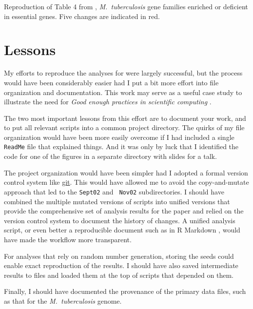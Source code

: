 \begin{table}
\caption{Reproduction of Table 4 from \citet{lamichhane2003},
\emph{M.\ tuberculosis\/} gene families enriched or deficient in
essential genes. Five changes are indicated in red.\label{tab:tab4}}

\centering
\small

\end{table}





\section{Lessons}


My efforts to reproduce the analyses for \citet{lamichhane2003} were
largely successful, but the process would have been considerably
easier had I put a bit more effort into file organization and
documentation. This work may serve as a useful case study to
illustrate the need for \emph{Good enough practices in scientific
computing} \citep{wilson2017}.

The two most important lessons from this effort are to document your
work, and to put all relevant scripts into a common project directory.
The quirks of my file organization would have been more easily
overcome if I had included a single {\tt ReadMe} file that explained
things. And it was only by luck that I identified the code for one of
the figures in a separate directory with slides for a talk.

The project organization would have been simpler had I
adopted a formal version control system like
\href{https://git-scm.com}{git}. This would have allowed me to avoid
the copy-and-mutate approach that led to the {\tt Sept02} and {\tt
Nov02} subdirectories. I should have combined the multiple mutated
versions of scripts into unified versions that provide the
comprehensive set of analysis results for the paper and relied on the
version control system to document the history of changes. A unified
analysis script, or even better a reproducible document such as in R
Markdown \citep{rmarkdown-book,rmarkdown-pkg}, would have made the
workflow more transparent.

For analyses that rely on random number generation, storing the seeds
could enable exact reproduction of the results. I should have also
saved intermediate results to files and loaded them at the top of
scripts that depended on them.

Finally, I should have documented the provenance of the primary data
files, such as that for the \emph{M.\ tuberculosis\/} genome.
